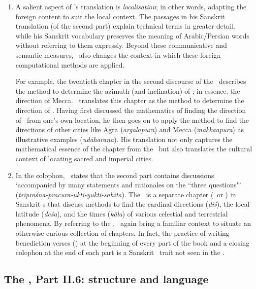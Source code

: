\begin{enumerate}[topsep=0pt]
\begin{itemize}
    \end{itemize}
    

    \item A salient aspect of \Nityananda's translation is \textit{localisation}; in other words, adapting the foreign content to suit the local context. The passages in his Sanskrit translation (of the second part) explain technical terms in greater detail, while his Sanskrit vocabulary preserves the meaning of Arabic/Persian words without referring to them expressly. Beyond these  communicative and semantic measures, \Nityananda\ also changes the context in which these foreign computational methods are applied.
    
    For example, the twentieth chapter in the second discourse of the \ZijiShahJahani\ describes the method to determine the azimuth (and inclination) of \qibla; in essence, the direction of Mecca. \Nityananda\ translates this chapter as the method to determine the direction of \Kashi. Having first discussed the mathematics of finding the direction of \Kashi\ from one's own location, he then goes on to apply the method to find the directions of other cities like Agra (\textit{argalapura}) and Mecca (\textit{makkaapura}) as illustrative examples (\textit{udāharaṇa}). His translation not only captures the mathematical essence of the chapter from the \ZijiShahJahani\ but also translates the cultural context of locating sacred and imperial cities. 
    \item \label{triprasna_remark} In the colophon, \Nityananda\ states that the second part contains discussions `accompanied by many statements and rationales on the ``three questions"' (\textit{tripraśna-pracura-ukti-yukti-sahita}). The \triprasnadhikara\ is a separate chapter (\adhyaya\ or \adhikara) in Sanskrit \siddhanta s that discuss methods to find the cardinal directions (\textit{diś}), the local latitude (\textit{deśa}), and the times (\textit{kāla}) of various celestial and terrestrial phenomena. By referring to the \triprasna, \Nityananda\ again bring a familiar context to situate an otherwise curious collection of chapters. In fact, the practice of writing benediction verses (\mangalacarana) at the beginning of every part of the book and a closing colophon at the end of each part is a Sanskrit \siddhantic\ trait not seen in the \ZijiShahJahani. 
\end{enumerate}

\subsection{The \Siddhantasindhu, Part II.6: structure and language}
\label{chapter_six_zij_sindhu_comparision}

